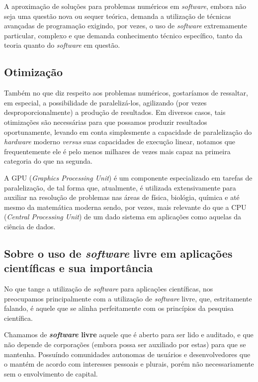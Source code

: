 \documentclass[10pt, a4paper, draftcls, conference, onecolumn]{IEEEtran}
\begin{document}
A aproximação de soluções para problemas numéricos em \textit{software}, embora
não seja uma questão nova ou sequer teórica, demanda a utilização de técnicas
avançadas de programação exigindo, por vezes, o uso de \textit{software}
extremamente particular, complexo e que demanda conhecimento técnico
específico, tanto da teoria quanto do \textit{software} em questão.

\subsection{Otimização}

Também no que diz respeito aos problemas numéricos, gostaríamos de ressaltar,
em especial, a possibilidade de paralelizá-los, agilizando (por vezes
desproporcionalmente) a produção de resultados. Em diversos casos, tais
otimizações são necessárias para que possamos produzir resultados
oportunamente, levando em conta simplesmente a capacidade de paralelização do
\textit{hardware} moderno \textit{versus} suas capacidades de execução linear,
notamos que frequentemente ele é pelo menos milhares de vezes mais capaz na
primeira categoria do que na segunda.

A GPU (\textit{Graphics Processing Unit}) é um componente especializado em
tarefas de paralelização, de tal forma que, atualmente, é utilizada
extensivamente para auxiliar na resolução de problemas nas áreas de física,
biológia, química e até mesmo da matemática moderna sendo, por vezes, mais
relevante do que a CPU (\textit{Central Processing Unit}) de um dado sistema em
aplicações como aquelas da ciência de dados.

\subsection{Sobre o uso de \textit{software} livre em aplicações científicas e sua importância}\label{sec:soft-livre}

No que tange a utilização de \textit{software} para aplicações científicas, nos
preocupamos principalmente com a utilização de \textit{software} livre, que,
estritamente falando, é aquele que se alinha perfeitamente com os princípios da
pesquisa científica.

Chamamos de \textbf{\textit{software} livre} aquele que é aberto para ser lido
e auditado, e que não depende de corporações (embora possa ser auxiliado por
estas) para que se mantenha. Possuíndo comunidades autonomas de usuários e
desenvolvedores que o mantém de acordo com interesses pessoais e plurais, porém
não necessariamente sem o envolvimento de capital.
\end{document}
